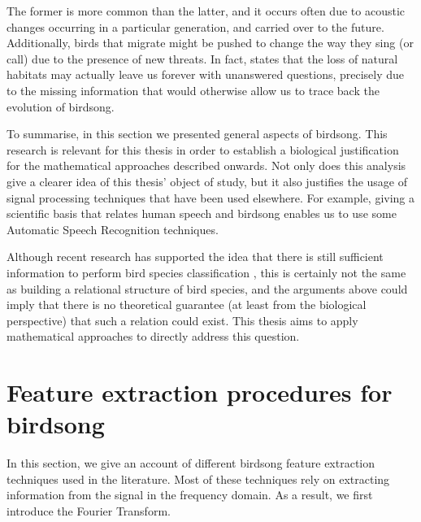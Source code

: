 \documentclass[../main.tex]{subfiles} \label{chapter_soa}
\begin{document}
\par The former is more common than the latter, and it occurs often due to acoustic changes occurring in a particular generation, and carried over to the future. Additionally, birds that migrate might be pushed to change the way they sing (or call) due to the presence of new threats. In fact, \cite{Marler2004} states that the loss of natural habitats may actually leave us forever with unanswered questions, precisely due to the missing information that would otherwise allow us to trace back the evolution of birdsong.
\par To summarise, in this section we presented general aspects of birdsong. This research is relevant for this thesis in order to establish a biological justification for the mathematical approaches described onwards. Not only does this analysis give a clearer idea of this thesis' object of study, but it also justifies the usage of signal processing techniques that have been used elsewhere. For example, giving a scientific basis that relates human speech and birdsong enables us to use some Automatic Speech Recognition techniques.
\par Although recent research has supported the idea that there is still sufficient information to perform bird species classification \cite{Naguib2014}, this is certainly not the same as building a relational structure of bird species, and the arguments above could imply that there is no theoretical guarantee (at least from the biological perspective) that such a relation could exist. This thesis aims to apply mathematical approaches to directly address this question.

\section{Feature extraction procedures for birdsong} \label{features_review}
In this section, we give an account of different birdsong feature extraction techniques used in the literature. Most of these techniques rely on extracting information from the signal in the frequency domain. As a result, we first introduce the Fourier Transform.
\end{document}
